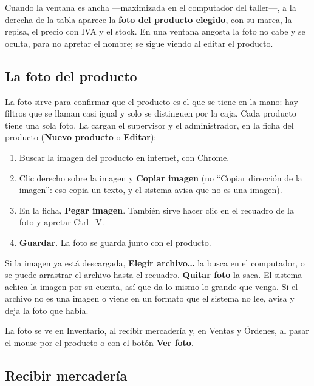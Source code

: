 \documentclass[11pt,a4paper]{article}
\begin{document}
Cuando la ventana es ancha ---maximizada en el computador del taller---, a la
derecha de la tabla aparece la \textbf{foto del producto elegido}, con su marca,
la repisa, el precio con IVA y el stock. En una ventana angosta la foto no cabe
y se oculta, para no apretar el nombre; se sigue viendo al editar el producto.

\subsection{La foto del producto}
\label{sec:foto}


La foto sirve para confirmar que el producto es el que se tiene en la mano:
hay filtros que se llaman casi igual y solo se distinguen por la caja. Cada
producto tiene una sola foto. La cargan el supervisor y el administrador, en la
ficha del producto (\textbf{Nuevo producto} o \textbf{Editar}):

\begin{enumerate}
  \item Buscar la imagen del producto en internet, con Chrome.
  \item Clic derecho sobre la imagen y \textbf{Copiar imagen} (no ``Copiar
        dirección de la imagen'': eso copia un texto, y el sistema avisa que no
        es una imagen).
  \item En la ficha, \textbf{Pegar imagen}. También sirve hacer clic en el
        recuadro de la foto y apretar Ctrl+V.
  \item \textbf{Guardar}. La foto se guarda junto con el producto.
\end{enumerate}

Si la imagen ya está descargada, \textbf{Elegir archivo\ldots} la busca en el
computador, o se puede arrastrar el archivo hasta el recuadro. \textbf{Quitar
foto} la saca. El sistema achica la imagen por su cuenta, así que da lo mismo
lo grande que venga. Si el archivo no es una imagen o viene en un formato que
el sistema no lee, avisa y deja la foto que había.

La foto se ve en Inventario, al recibir mercadería y, en Ventas y Órdenes, al
pasar el mouse por el producto o con el botón \textbf{Ver foto}.

\subsection{Recibir mercadería}
\end{document}
